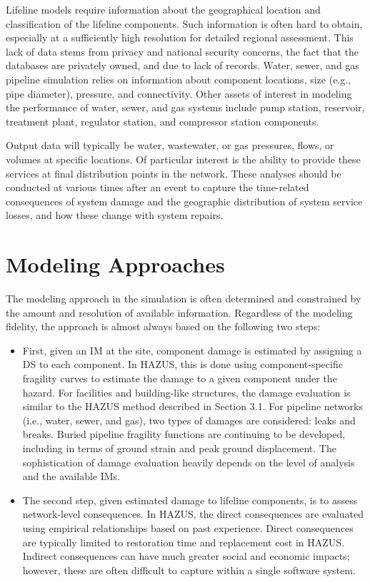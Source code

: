 Lifeline models require information about the geographical location and classification of the lifeline components. Such information is often hard to obtain, especially at a sufficiently high resolution for detailed regional assessment. This lack of data stems from privacy and national security concerns, the fact that the databases are privately owned, and due to lack of records. Water, sewer, and gas pipeline simulation relies on information about component locations, size (e.g., pipe diameter), pressure, and connectivity. Other assets of interest in modeling the performance of water, sewer, and gas systems include pump station, reservoir, treatment plant, regulator station, and compressor station components.

Output data will typically be water, wastewater, or gas pressures, flows, or volumes at specific locations. Of particular interest is the ability to provide these services at final distribution points in the network. These analyses should be conducted at various times after an event to capture the time-related consequences of system damage and the geographic distribution of system service losses, and how these change with system repairs.

\section{Modeling Approaches}
\label{sec:perf_pipeline_methods}

The modeling approach in the simulation is often determined and constrained by the amount and resolution of available information. Regardless of the modeling fidelity, the approach is almost always based on the following two steps: 

\begin{itemize}
    \item First, given an IM at the site, component damage is estimated by assigning a DS to each component. In HAZUS, this is done using component-specific fragility curves to estimate the damage to a given component under the hazard. For facilities and building-like structures, the damage evaluation is similar to the HAZUS method described in Section 3.1. For pipeline networks (i.e., water, sewer, and gas), two types of damages are considered: leaks and breaks. Buried pipeline fragility functions are continuing to be developed, including in terms of ground strain and peak ground displacement. The sophistication of damage evaluation heavily depends on the level of analysis and the available IMs. 
    \item The second step, given estimated damage to lifeline components, is to assess network-level consequences. In HAZUS, the direct consequences are evaluated using empirical relationships based on past experience. Direct consequences are typically limited to restoration time and replacement cost in HAZUS. Indirect consequences can have much greater social and economic impacts; however, these are often difficult to capture within a single software system.
\end{itemize}

